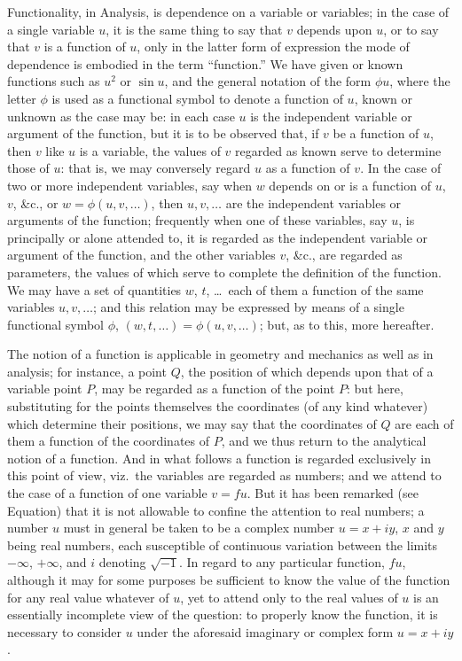 \documentclass[11pt,a4paper]{book}
\begin{document}
Functionality, in Analysis, is dependence on a variable or variables; in the case of a single variable $u$, it is the same thing to say that $v$ depends upon $u$, or to say that $v$ is a function of $u$, only in the latter form of expression the mode of dependence is embodied in the term ``function.'' We have given or known functions such as $u^{2}$ or $\sin u$, and the general notation of the form $\phi u$, where the letter $\phi$ is used as a functional symbol to denote a function of $u$, known or unknown as the case may be: in each case $u$ is the independent variable or argument of the function, but it is to be observed that, if $v$ be a function of $u$, then $v$ like $u$ is a variable, the values of $v$ regarded as known serve to determine those of $u$: that is, we may conversely regard $u$ as a function of $v$. In the case of two or more independent variables, say when $w$ depends on or is a function of $u$, $v$, \&c., or $w = \phi(u, v, \ldots)$, then $u, v, \ldots$ are the independent variables or arguments of the function; frequently when one of these variables, say $u$, is principally or alone attended to, it is regarded as the independent variable or argument of the function, and the other variables $v$, \&c., are regarded as parameters, the values of which serve to complete the definition of the function. We may have a set of quantities $w$, $t$, \ldots\ each of them a function of the same variables $u, v, \ldots$; and this relation may be expressed by means of a single functional symbol $\phi$, $(w, t, \ldots) = \phi(u, v, \ldots)$; but, as to this, more hereafter.

The notion of a function is applicable in geometry and mechanics as well as in analysis; for instance, a point $Q$, the position of which depends upon that of a variable point $P$, may be regarded as a function of the point $P$: but here, substituting for the points themselves the coordinates (of any kind whatever) which determine their positions, we may say that the coordinates of $Q$ are each of them a function of the coordinates of $P$, and we thus return to the analytical notion of a function. And in what follows a function is regarded exclusively in this point of view, viz.\ the variables are regarded as numbers; and we attend to the case of a function of one variable $v = f u$. But it has been remarked (see Equation) that it is not allowable to confine the attention to real numbers; a number $u$ must in general be taken to be a complex number $u = x + iy$, $x$ and $y$ being real numbers, each susceptible of continuous variation between the limits $-\infty$, $+\infty$, and $i$ denoting $\sqrt{-1}$. In regard to any particular function, $fu$, although it may for some purposes be sufficient to know the value of the function for any real value whatever of $u$, yet to attend only to the real values of $u$ is an essentially incomplete view of the question: to properly know the function, it is necessary to consider $u$ under the aforesaid imaginary or complex form $u = x + iy$.
\end{document}
